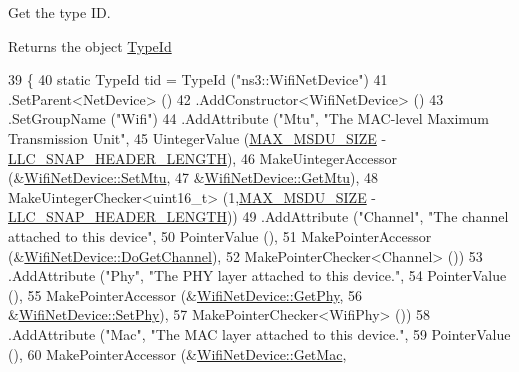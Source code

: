 Get the type ID. 

\begin{DoxyReturn}{Returns}
the object \hyperlink{classns3_1_1TypeId}{Type\+Id} 
\end{DoxyReturn}

\begin{DoxyCode}
39 \{
40   \textcolor{keyword}{static} TypeId tid = TypeId (\textcolor{stringliteral}{"ns3::WifiNetDevice"})
41     .SetParent<NetDevice> ()
42     .AddConstructor<WifiNetDevice> ()
43     .SetGroupName (\textcolor{stringliteral}{"Wifi"})
44     .AddAttribute (\textcolor{stringliteral}{"Mtu"}, \textcolor{stringliteral}{"The MAC-level Maximum Transmission Unit"},
45                    UintegerValue (\hyperlink{classns3_1_1WifiNetDevice_a44ed8fe233665265e6c516b807d8c2e9}{MAX\_MSDU\_SIZE} - 
      \hyperlink{namespacens3_af8522e22bcdefd901bcf12e260491ec8}{LLC\_SNAP\_HEADER\_LENGTH}),
46                    MakeUintegerAccessor (&\hyperlink{classns3_1_1WifiNetDevice_a56430a4ab8018bdb09cf48e0b7bff396}{WifiNetDevice::SetMtu},
47                                          &\hyperlink{classns3_1_1WifiNetDevice_a756390688e2b5a279414d41ce5eaa3c9}{WifiNetDevice::GetMtu}),
48                    MakeUintegerChecker<uint16\_t> (1,\hyperlink{classns3_1_1WifiNetDevice_a44ed8fe233665265e6c516b807d8c2e9}{MAX\_MSDU\_SIZE} - 
      \hyperlink{namespacens3_af8522e22bcdefd901bcf12e260491ec8}{LLC\_SNAP\_HEADER\_LENGTH}))
49     .AddAttribute (\textcolor{stringliteral}{"Channel"}, \textcolor{stringliteral}{"The channel attached to this device"},
50                    PointerValue (),
51                    MakePointerAccessor (&\hyperlink{classns3_1_1WifiNetDevice_a90d7955901fe2632e2dbd058f3729625}{WifiNetDevice::DoGetChannel}),
52                    MakePointerChecker<Channel> ())
53     .AddAttribute (\textcolor{stringliteral}{"Phy"}, \textcolor{stringliteral}{"The PHY layer attached to this device."},
54                    PointerValue (),
55                    MakePointerAccessor (&\hyperlink{classns3_1_1WifiNetDevice_a6a752f4afd2e28b04c83ba26568efd78}{WifiNetDevice::GetPhy},
56                                         &\hyperlink{classns3_1_1WifiNetDevice_a8bce2115a297537267a08769234da342}{WifiNetDevice::SetPhy}),
57                    MakePointerChecker<WifiPhy> ())
58     .AddAttribute (\textcolor{stringliteral}{"Mac"}, \textcolor{stringliteral}{"The MAC layer attached to this device."},
59                    PointerValue (),
60                    MakePointerAccessor (&\hyperlink{classns3_1_1WifiNetDevice_a48a0f63009cc101fd7d8338a7b3dc482}{WifiNetDevice::GetMac},

\end{DoxyCode}
